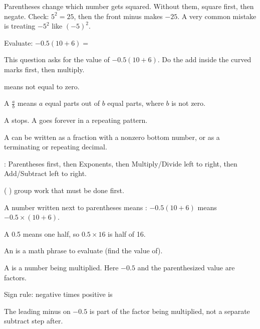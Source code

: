 
\noindent Parentheses change which number gets squared. Without them, square first, then negate. Check: $5^{2} = 25$, then the front minus makes $-25$. A very common mistake is treating $-5^{2}$ like $(-5)^{2}$.




\noindent Evaluate: $-0.5(10 + 6) =$


\noindent This question asks for the value of $-0.5(10 + 6)$. Do the add inside the curved marks first, then multiply.

\begin{words}
  \item {}means not equal to zero.
  \item A $\frac{a}{b}$ means $a$ equal parts out of $b$ equal parts, where $b$ is not zero.
  \item A stops. A goes forever in a repeating pattern.
  \item A can be written as a fraction with a nonzero bottom number, or as a terminating or repeating decimal.
  \item {}: Parentheses first, then Exponents, then Multiply/Divide left to right, then Add/Subtract left to right.
  \item {}( ) group work that must be done first.
  \item A number written next to parentheses means : $-0.5(10 + 6)$ means $-0.5 \times (10 + 6)$.
  \item A 0.5 means one half, so $0.5 \times 16$ is half of 16.
  \item An is a math phrase to evaluate (find the value of).
  \item A is a number being multiplied. Here $-0.5$ and the parenthesized value are factors.
  \item Sign rule: negative times positive is 
  \item The leading minus on $-0.5$ is part of the factor being multiplied, not a separate subtract step after.
\end{words}

